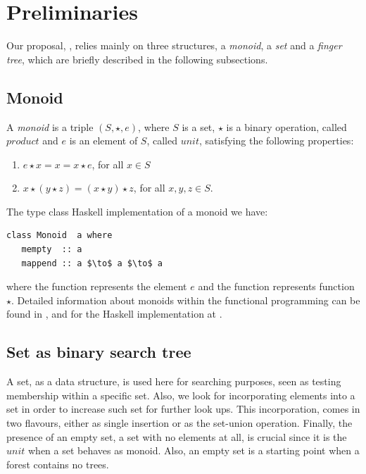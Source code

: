 \section{Preliminaries} 
\label{sec:Prelim} 

Our proposal, \dyntset, relies mainly on three structures, a \textit{monoid}, a \textit{set} and a \textit{finger tree}, which are briefly described in the following subsections. 

\subsection{Monoid}

A \textit{monoid} is a triple $(S,\star,e)$, where $S$ is a set, $\star$ is a binary operation, called $product$ and $e$ is an element of $S$, called $unit$, satisfying the following properties:

\begin{enumerate}
\item $e \star x = x = x \star e$, for all $x \in S$ 
\item $x \star (y \star z) = (x \star y) \star z $, for all $x,y,z \in S$.  
\end{enumerate}

The type class Haskell implementation of a monoid we have:
\begin{lstlisting}[mathescape]
class Monoid  a where 
   mempty  :: a
   mappend :: a $\to$ a $\to$ a
\end{lstlisting}   

where the function  represents the element $e$ and the function  represents function $\star$. Detailed information about monoids within the functional programming can be found in \cite{Monoids}, and for the Haskell implementation at \cite{HaskellMonoid}.


\subsection{Set as binary search tree} 

A set, as a data structure, is used here for searching purposes, seen as testing membership within a specific set. Also, we look for incorporating elements into a set in order to increase such set for further look ups. This incorporation, comes in two flavours, either as single insertion or as the set-union operation. Finally, the presence of an empty set, a set with no elements at all, is crucial since it is the $unit$ when a set behaves as monoid. Also, an empty set is a starting point when a forest contains no trees.

